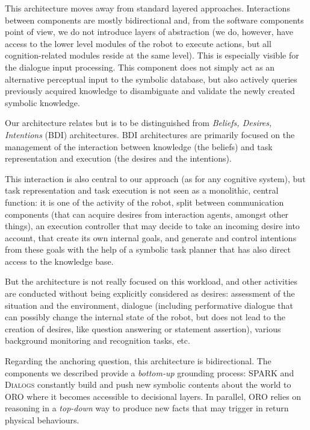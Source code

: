 This architecture moves away from standard layered approaches. Interactions
between components are mostly bidirectional and, from the software components
point of view, we do not introduce layers of abstraction (we do, however, have
access to the lower level modules of the robot to execute actions, but all
cognition-related modules reside at the same level). This is especially visible
for the dialogue input processing. This component does not simply act as an
alternative perceptual input to the symbolic database, but also actively
queries previously acquired knowledge to disambiguate and validate the newly
created symbolic knowledge.

Our architecture relates but is to be distinguished from \emph{Beliefs,
Desires, Intentions} (BDI) architectures. BDI architectures are primarily
focused on the management of the interaction between knowledge (the beliefs)
and task representation and execution (the desires and the intentions).

This interaction is also central to our approach (as for any cognitive system),
but task representation and task execution is not seen as a monolithic, central
function: it is one of the activity of the robot, split between communication
components (that can acquire desires from interaction agents, amongst other
things), an execution controller that may decide to take an incoming desire
into account, that create its own internal goals, and generate and control
intentions from these goals with the help of a symbolic task planner that has
also direct access to the knowledge base.

But the architecture is not really focused on this workload, and other
activities are conducted without being explicitly considered as desires:
assessment of the situation and the environment, dialogue (including
performative dialogue that can possibly change the internal state of the robot,
but does not lead to the creation of desires,  like question answering or
statement assertion), various background monitoring and recognition tasks, etc.

Regarding the anchoring question, this architecture is bidirectional. The
components we described provide a \textit{bottom-up} grounding process: SPARK
and \textsc{Dialogs} constantly build and push new symbolic contents about the
world to ORO where it becomes accessible to decisional layers. In parallel, ORO
relies on reasoning in a \textit{top-down} way to produce new facts that may
trigger in return physical behaviours. 

